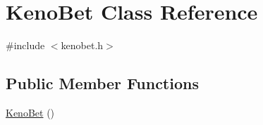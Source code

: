 \hypertarget{classKenoBet}{}\section{Keno\+Bet Class Reference}
\label{classKenoBet}


{\ttfamily \#include $<$kenobet.\+h$>$}

\subsection*{Public Member Functions}
\begin{DoxyCompactItemize}
\item 
\hyperlink{classKenoBet_a383bdbb38df73584f72670a1cd0f777b}{Keno\+Bet} ()\hypertarget{classKenoBet_a383bdbb38df73584f72670a1cd0f777b}{}\label{classKenoBet_a383bdbb38df73584f72670a1cd0f777b}


\end{DoxyCompactItemize}
